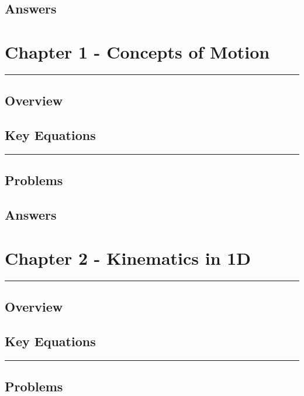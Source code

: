\documentclass[a4paper,12pt]{article}
\begin{document}


\subsection*{Answers}



\pagebreak
\noindent\section*{Chapter 1 - Concepts of Motion}
\rule{\linewidth}{1pt}
\subsection*{Overview}

\subsection*{Key Equations}

\begin{center}
  \rule{6cm}{0.5pt}
\end{center}
\subsection*{Problems}
\subsection*{Answers}

\pagebreak
\section*{Chapter 2 - Kinematics in 1D}
\rule{\linewidth}{1pt}
\subsection*{Overview}

\subsection*{Key Equations}

\begin{center}
  \rule{6cm}{0.5pt}
\end{center}
\subsection*{Problems}
\end{document}
